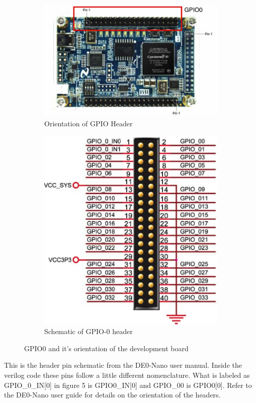 \documentclass[12pt,journal]{IEEEtran}
\begin{document}
        \begin{figure}
          \centering
          \begin{subfigure}[b]{.38\textwidth}
            \includegraphics[angle=270, width=.9\textwidth]{Images/LabeledGPIOHeaders.jpg}
            \caption{Orientation of GPIO Header\cite{DE0Manual}}
          \end{subfigure}
          \begin{subfigure}[b]{.45\textwidth}
            \includegraphics[width=\textwidth]{Images/GPIOHeader.jpg}
            \caption{Schematic of GPIO-0 header\cite{DE0Manual}}
          \end{subfigure}
          \caption{GPIO0 and it's orientation of the development board}
          \label{pinmap}
        \end{figure}
        This is the header pin schematic from the DE0-Nano user manual. Inside the verilog code these pins follow a little different nomenclature. What is labeled as GPIO\_0\_IN[0] in figure 5 is GPIO0\_IN[0] and GPIO\_00 is GPIO0[0]. Refer to the DE0-Nano user guide for details on the orientation of the headers.
\end{document}
